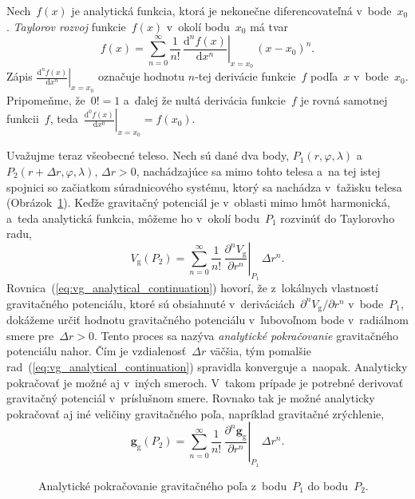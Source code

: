\documentclass[a4paper, 12pt]{book}
\newcommand{\diff}{\mathrm d}
\newcommand{\gidx}{\mathrm g}
\let\vec\mathbf
\begin{document}
Nech~$f(x)$ je analytická funkcia, ktorá je nekonečne diferencovateľná 
v~bode~$x_0$.  \emph{Taylorov rozvoj} funkcie~$f(x)$ v~okolí bodu~$x_0$ má tvar
%
\begin{equation}
\label{eq:f_taylor}
f(x) = \sum_{n = 0}^\infty \frac{1}{n!} \, \left.\frac{\diff^n f(x)}{\diff x^n} 
\right|_{x = x_0} \, (x - x_0)^n{.}
\end{equation}
%
Zápis $\left.\frac{\diff^n f(x)}{\diff x^n} \right|_{x = x_0}$ označuje hodnotu 
$n$-tej derivácie funkcie~$f$ podľa~$x$ v~bode~$x_0$.  Pripomeňme, že~$0!  = 1$ 
a~ďalej že nultá derivácia funkcie~$f$ je rovná samotnej funkcii~$f$, 
teda~$\left.\frac{\diff^0 f(x)}{\diff x^0}\right|_{x = x_0} = f(x_0)$.

Uvažujme teraz všeobecné teleso.  Nech sú dané dva body,
$P_1(r, \varphi, \lambda)$ a~$P_2(r + \Delta r, \varphi, \lambda)$, $\Delta
r > 0$, nachádzajúce sa mimo tohto telesa a~na tej istej spojnici so začiatkom
súradnicového systému, ktorý sa nachádza v~ťažisku telesa
(Obrázok~\ref{fig:analytical_continuation}).  Keďže gravitačný potenciál je 
v~oblasti mimo hmôt harmonická, a~teda analytická funkcia, môžeme ho v~okolí 
bodu~$P_1$ rozvinúť do Taylorovho radu,
%
\begin{equation}
\label{eq:vg_analytical_continuation}
V_\gidx(P_2) = \sum_{n = 0}^\infty \frac{1}{n!} \, \left.\frac{\partial^n
V_\gidx}{\partial r^n}\right|_{P_1} \, \Delta r^n{.}
\end{equation}
%
Rovnica~(\ref{eq:vg_analytical_continuation}) hovorí, že z~lokálnych vlastností 
gravitačného potenciálu, ktoré sú obsiahnuté v~deriváciách~$\partial^n V_\gidx 
\slash \partial r^n$ v~bode~$P_1$, dokážeme určiť hodnotu gravitačného 
potenciálu v~ľubovoľnom bode v~radiálnom smere pre~$\Delta r > 0$.  Tento 
proces sa nazýva \emph{analytické pokračovanie} gravitačného potenciálu nahor.  
Čím je vzdialenosť~$\Delta r$ väčšia, tým pomalšie 
rad~(\ref{eq:vg_analytical_continuation}) spravidla konverguje a~naopak.  
Analyticky pokračovať je možné aj v~iných smeroch.  V~takom prípade je potrebné 
derivovať gravitačný potenciál v~príslušnom smere.  Rovnako tak je možné 
analyticky pokračovať aj iné veličiny gravitačného poľa, napríklad gravitačné 
zrýchlenie,
%
\begin{equation}
\label{eq:gg_analytical_continuation}
\vec g_\gidx(P_2) = \sum_{n = 0}^{\infty} \frac{1}{n!} \, 
\left.\frac{\partial^n \vec
g_\gidx}{\partial r^n}\right|_{P_1} \, \Delta r^n{.}
\end{equation}

\begin{figure}
\centering

\caption{Analytické pokračovanie gravitačného poľa z~bodu~$P_1$ do bodu~$P_2$.}
\label{fig:analytical_continuation}
\end{figure}
\end{document}
